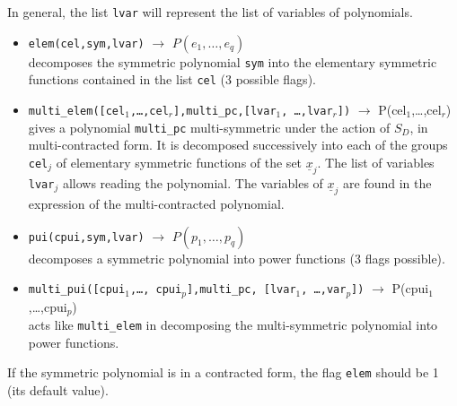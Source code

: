 \documentclass[11pt]{article}
\begin{document}
In general, the list \texttt{lvar} will represent the list of variables of
polynomials.
\begin{itemize}
  \item \texttt{elem(cel,sym,lvar)} 
    $\longrightarrow$  $P(e_1,\dots,e_q)$ \\
    decomposes the symmetric polynomial \texttt{sym} into the elementary symmetric
    functions contained in the list \texttt{cel} (3 possible flags).
  \item \texttt{multi\_elem([cel$_{1}$,\dots,cel$_{r}$],multi\_pc,[lvar$_{1}$,
     \dots,lvar$_{r}$])}
      $\longrightarrow$ P(cel$_{1}$,\dots,cel$_{r}$) \\
    gives a polynomial \texttt{multi\_pc} multi-symmetric under the action
    of $S_D$, in multi-contracted form.  It is decomposed successively into each
    of the groups \texttt{cel$_{j}$} of elementary symmetric functions of the set 
    ${\underline x}_j$.  The list of variables \texttt{lvar}$_j$ allows reading
    the polynomial.  The variables of ${\underline x}_j$ are found in the
    expression of the multi-contracted polynomial.
  \item \texttt{pui(cpui,sym,lvar)} 
    $\longrightarrow$ $P(p_1,\dots,p_q)$ \\ decomposes a symmetric polynomial into
    power functions (3 flags possible).
  \item \texttt{multi\_pui([cpui$_{1}$,\ldots, cpui$_{p}$],multi\_pc, [lvar$_{1}$, \ldots,var$_{p}$])}
    $\longrightarrow$ P(cpui$_{1}$,\ldots,cpui$_{p}$) \\ 
    acts like \texttt{multi\_elem} in decomposing the multi-symmetric polynomial
    into power functions.
\end{itemize}
If the symmetric polynomial is in a contracted form, the flag \texttt{elem}
should be 1 (its default value).
\end{document}
